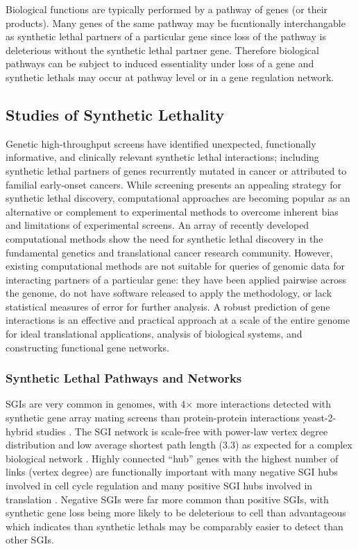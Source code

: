 Biological functions are typically performed by a pathway of genes (or their products). Many genes of the same pathway may be fucntionally interchangable as \gls{synthetic lethal} partners of a particular gene since loss of the pathway is deleterious without the \gls{synthetic lethal} partner gene. Therefore biological pathways can be subject to induced essentiality under loss of a gene and \glspl{synthetic lethal} may occur at pathway level or in a gene regulation network. 

\subsection{Studies of Synthetic Lethality}
Genetic high-throughput screens have identified unexpected, functionally informative, and clinically relevant \gls{synthetic lethal} interactions; including \gls{synthetic lethal} partners of genes recurrently mutated in cancer or attributed to familial early-onset cancers. While screening presents an appealing strategy for \gls{synthetic lethal} discovery, computational approaches are becoming popular as an alternative or complement to experimental methods to overcome inherent bias and limitations of experimental screens. An array of recently developed computational methods \citep{Wang2013, Tiong2014, Jerby2014, Lu2015, Wappett2014} show the need for \gls{synthetic lethal} discovery in the fundamental genetics and translational cancer research community. However, existing computational methods are not suitable for queries of genomic data for interacting partners of a particular gene: they have been applied pairwise across the genome, do not have software released to apply the methodology, or lack statistical measures of error for further analysis. A robust prediction of gene interactions is an effective and practical approach at a scale of the entire genome for ideal translational applications, analysis of biological systems, and constructing functional gene networks.

\subsubsection{Synthetic Lethal Pathways and Networks}
\glspl{SGI} are very common in genomes, with 4$\times$ more interactions detected with synthetic gene array mating screens than protein-protein interactions yeast-2-hybrid studies \citep{Tong2004}. The \gls{SGI} network is scale-free with power-law vertex degree distribution and low average shortest path length (3.3) as expected for a complex biological network \citep{Barabasi2004}. Highly connected ``hub'' genes with the highest number of links (vertex degree) are functionally important with many negative \gls{SGI} hubs involved in cell cycle regulation and many positive \gls{SGI} hubs involved in translation \citep{Baryshnikova2010b, Costanzo2010}. Negative \glspl{SGI} were far more common than positive \glspl{SGI}, with synthetic gene loss being more likely to be deleterious to cell than advantageous which indicates than \glspl{synthetic lethal} may be comparably easier to detect than other \glspl{SGI}. 

